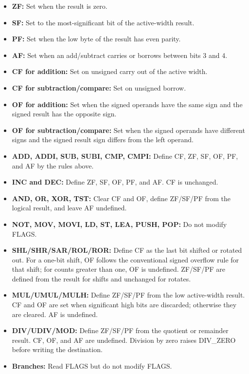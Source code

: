 \documentclass[11pt]{article}
\begin{document}
\begin{itemize}
    \item \textbf{ZF:} Set when the result is zero.
    \item \textbf{SF:} Set to the most-significant bit of the active-width result.
    \item \textbf{PF:} Set when the low byte of the result has even parity.
    \item \textbf{AF:} Set when an add/subtract carries or borrows between bits 3 and 4.
    \item \textbf{CF for addition:} Set on unsigned carry out of the active width.
    \item \textbf{CF for subtraction/compare:} Set on unsigned borrow.
    \item \textbf{OF for addition:} Set when the signed operands have the same sign and the signed result has the opposite sign.
    \item \textbf{OF for subtraction/compare:} Set when the signed operands have different signs and the signed result sign differs from the left operand.
\end{itemize}

\begin{itemize}
    \item \textbf{ADD, ADDI, SUB, SUBI, CMP, CMPI:} Define CF, ZF, SF, OF, PF, and AF by the rules above.
    \item \textbf{INC and DEC:} Define ZF, SF, OF, PF, and AF. CF is unchanged.
    \item \textbf{AND, OR, XOR, TST:} Clear CF and OF, define ZF/SF/PF from the logical result, and leave AF undefined.
    \item \textbf{NOT, MOV, MOVI, LD, ST, LEA, PUSH, POP:} Do not modify FLAGS.
    \item \textbf{SHL/SHR/SAR/ROL/ROR:} Define CF as the last bit shifted or rotated out. For a one-bit shift, OF follows the conventional signed overflow rule for that shift; for counts greater than one, OF is undefined. ZF/SF/PF are defined from the result for shifts and unchanged for rotates.
    \item \textbf{MUL/UMUL/MULH:} Define ZF/SF/PF from the low active-width result. CF and OF are set when significant high bits are discarded; otherwise they are cleared. AF is undefined.
    \item \textbf{DIV/UDIV/MOD:} Define ZF/SF/PF from the quotient or remainder result. CF, OF, and AF are undefined. Division by zero raises DIV\_ZERO before writing the destination.
    \item \textbf{Branches:} Read FLAGS but do not modify FLAGS.
\end{itemize}
\end{document}
